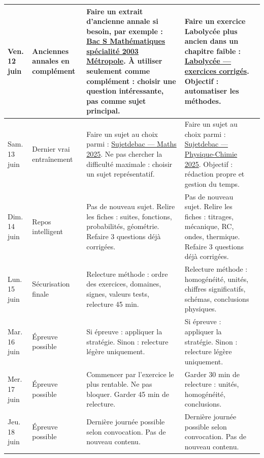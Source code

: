 \documentclass[11pt,a4paper]{article}
\newcommand{\checkbox}{\ding{113}}
\begin{document}
\begin{longtable}{|p{2.2cm}|p{2.8cm}|p{5.3cm}|p{5.3cm}|p{1.5cm}|}
Ven. 12 juin &
Anciennes annales en complément &
Faire un extrait d'ancienne annale si besoin, par exemple :
\href{https://www.sujetdebac.fr/annales/s-mathematiques-specialite-2003-metropole}{Bac S Mathématiques spécialité 2003 Métropole}.  
À utiliser seulement comme complément : choisir une question intéressante, pas comme sujet principal. &
Faire un exercice Labolycée plus ancien dans un chapitre faible :
\href{https://www.labolycee.org/}{Labolycée — exercices corrigés}.  
Objectif : automatiser les méthodes. &
\checkbox\\
\hline

Sam. 13 juin &
Dernier vrai entraînement &
Faire un sujet au choix parmi :
\href{https://www.sujetdebac.fr/annales/specialites/spe-mathematiques/2025/}{Sujetdebac — Maths 2025}.  
Ne pas chercher la difficulté maximale : choisir un sujet représentatif. &
Faire un sujet au choix parmi :
\href{https://www.sujetdebac.fr/annales/specialites/spe-physique-chimie/2025/}{Sujetdebac — Physique-Chimie 2025}.  
Objectif : rédaction propre et gestion du temps. &
\checkbox\\
\hline

Dim. 14 juin &
Repos intelligent &
Pas de nouveau sujet.  
Relire les fiches : suites, fonctions, probabilités, géométrie.  
Refaire 3 questions déjà corrigées. &
Pas de nouveau sujet.  
Relire les fiches : titrages, mécanique, RC, ondes, thermique.  
Refaire 3 questions déjà corrigées. &
\checkbox\\
\hline

Lun. 15 juin &
Sécurisation finale &
Relecture méthode : ordre des exercices, domaines, signes, valeurs tests, relecture 45 min. &
Relecture méthode : homogénéité, unités, chiffres significatifs, schémas, conclusions physiques. &
\checkbox\\
\hline

Mar. 16 juin &
Épreuve possible &
Si épreuve : appliquer la stratégie.  
Sinon : relecture légère uniquement. &
Si épreuve : appliquer la stratégie.  
Sinon : relecture légère uniquement. &
\checkbox\\
\hline

Mer. 17 juin &
Épreuve possible &
Commencer par l'exercice le plus rentable.  
Ne pas bloquer.  
Garder 45 min de relecture. &
Garder 30 min de relecture : unités, homogénéité, conclusions. &
\checkbox\\
\hline

Jeu. 18 juin &
Épreuve possible &
Dernière journée possible selon convocation.  
Pas de nouveau contenu. &
Dernière journée possible selon convocation.  
Pas de nouveau contenu. &
\checkbox\\
\hline

\end{longtable}
\normalsize
\end{document}
